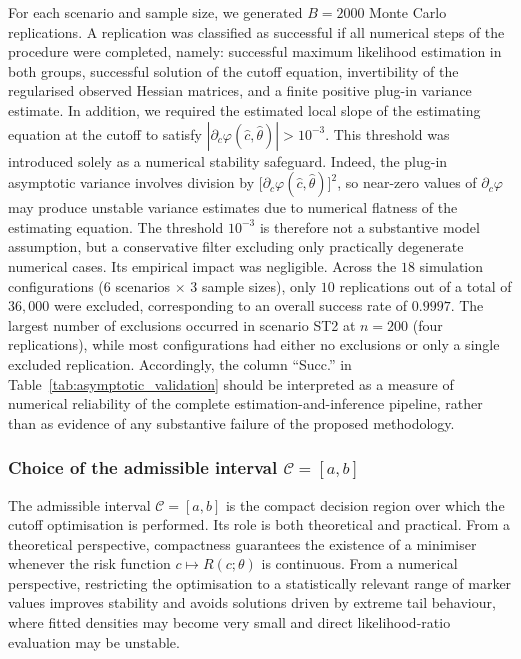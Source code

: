 \documentclass[11pt,a4paper]{article}
\theoremstyle{definition}
\theoremstyle{remark}
\newcommand{\1}{\mathbf{1}}
\begin{document}
For each scenario and sample size, we generated $B=2000$
Monte Carlo replications.
A replication was classified as successful if all numerical
steps of the procedure were completed, namely: successful
maximum likelihood estimation in both groups, successful
solution of the cutoff equation, invertibility of the
regularised observed Hessian matrices, and a finite positive
plug-in variance estimate.
In addition, we required the estimated local slope of the
estimating equation at the cutoff to satisfy
$|\partial_c\varphi(\hat c,\hat\theta)|>10^{-3}$.
This threshold was introduced solely as a numerical
stability safeguard.
Indeed, the plug-in asymptotic variance involves division by
$\bigl[\partial_c\varphi(\hat c,\hat\theta)\bigr]^2$, so
near-zero values of $\partial_c\varphi$ may produce unstable variance estimates due to numerical flatness of the estimating equation.
The threshold $10^{-3}$ is therefore not a substantive model assumption, but a conservative filter excluding only practically degenerate numerical cases. Its empirical impact was negligible. Across the $18$ simulation configurations ($6$ scenarios $\times$ $3$ sample sizes), only $10$ replications out of a total of $36{,}000$ were excluded, corresponding to an overall success rate of $0.9997$.
The largest number of exclusions occurred in scenario ST2 at $n=200$ (four replications), while most configurations had either no exclusions or only a single excluded replication. Accordingly, the column ``Succ.'' in Table~\ref{tab:asymptotic_validation} should be interpreted as a measure of numerical reliability of the complete estimation-and-inference pipeline, rather than as evidence of any substantive failure of the proposed methodology.

\subsubsection{Choice of the admissible interval \texorpdfstring{$\mathcal{C}=[a,b]$}{C=[a,b]}}

The admissible interval $\mathcal C=[a,b]$ is the compact decision region over which the cutoff optimisation is performed. Its role is both theoretical and practical. From a theoretical perspective, compactness guarantees the existence of a minimiser whenever the risk function $c\mapsto R(c;\theta)$ is continuous. From a numerical perspective, restricting the optimisation to a statistically relevant range of marker values improves stability and avoids solutions driven by extreme tail behaviour, where fitted densities may become very small and direct likelihood-ratio evaluation may be unstable.
\end{document}
